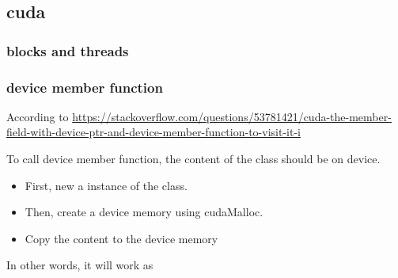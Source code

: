 \subsection{\label{cuda}cuda}

\subsubsection{\label{cudathreads}blocks and threads}

\subsubsection{\label{device member function}device member function}

According to \href{https://stackoverflow.com/questions/53781421/cuda-the-member-field-with-device-ptr-and-device-member-function-to-visit-it-i}{https://stackoverflow.com/questions/53781421/cuda-the-member-field-with-device-ptr-and-device-member-function-to-visit-it-i}

To call device member function, the content of the class should be on device.

\begin{itemize}
  \item First, new a instance of the class.
  \item Then, create a device memory using cudaMalloc.
  \item Copy the content to the device memory
\end{itemize}

In other words, it will work as

